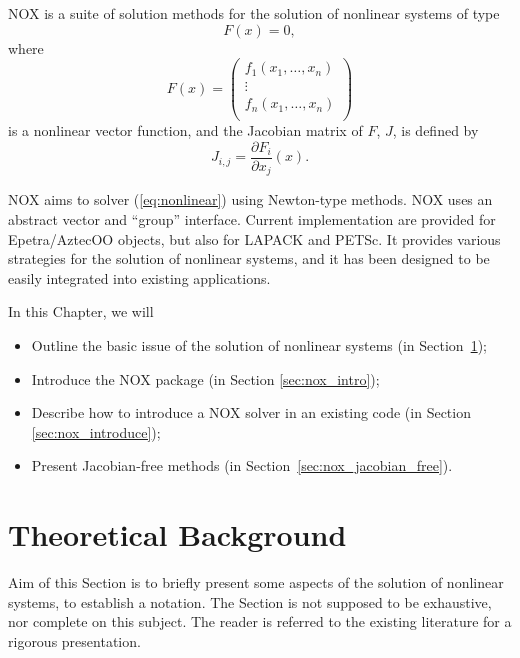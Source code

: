 \begin{introchapter}
NOX is a suite of solution methods for the solution of nonlinear
systems of type
\begin{equation}
\label{eq:nonlinear}
F(x) = 0,
\end{equation}
where
\[
F(x) = 
\begin{pmatrix}
  f_1(x_1, \ldots, x_n) \\
  \vdots \\
  f_n(x_1, \ldots, x_n) \\
\end{pmatrix}
\]
is a nonlinear vector function, and the Jacobian matrix of $F$, $J$, is
defined by
\[
J_{i,j} = \frac{ \partial F_i}{\partial x_j} (x).
\]

NOX aims to solver (\ref{eq:nonlinear}) using Newton-type methods. NOX
uses an abstract vector and ``group'' interface. Current implementation
are provided for Epetra/AztecOO objects, but also for LAPACK and PETSc.
It provides various strategies for the solution of nonlinear systems,
and it has been designed to be easily integrated into existing
applications.

In this Chapter, we will
\begin{itemize}
\item Outline the basic issue of the  solution of nonlinear
  systems (in Section~\ref{sec:nox_theoretical});
\item Introduce the NOX package (in Section \ref{sec:nox_intro});
\item Describe how to introduce a NOX solver in an existing code (in
  Section \ref{sec:nox_introduce});
\item Present Jacobian-free methods (in
  Section~\ref{sec:nox_jacobian_free}).
\end{itemize}
\end{introchapter}


\section{Theoretical Background}
\label{sec:nox_theoretical}

Aim of this Section is to briefly present some aspects of the solution
of nonlinear systems, to establish a notation. The Section is not
supposed to be exhaustive, nor complete on this subject. The reader is
referred to the existing literature for a rigorous presentation.

\medskip

